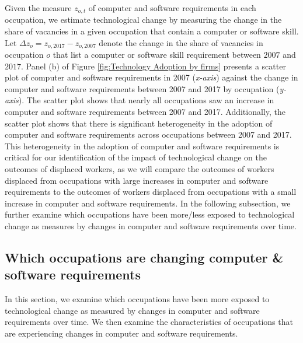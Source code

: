 \documentclass[12pt]{article}
\begin{document}
{Given the measure $z_{o,t}$ of computer and software requirements in each occupation, we estimate technological change by measuring the change in the share of vacancies in a given occupation that contain a computer or software skill. Let $\varDelta z_{o}=z_{o,2017}-z_{o,2007}$ denote the change in the share of vacancies in occupation $o$ that list a computer or software skill requirement between $2007$ and $2017$. Panel (b) of Figure \ref{fig:Technology Adoption by firms} presents a scatter plot of computer and software requirements in 2007 (\textit{x-axis}) against the change in computer and software requirements between 2007 and 2017 by occupation (\textit{y-axis}). The scatter plot shows that nearly all occupations saw an increase in computer and software requirements between 2007 and 2017. Additionally, the scatter plot shows that there is significant heterogeneity in the adoption of computer and software requirements across occupations between 2007 and 2017. This heterogeneity in the adoption of computer and software requirements is critical for our identification of the impact of technological change on the outcomes of displaced workers, as we will compare the outcomes of workers displaced from occupations with large increases in computer and software requirements to the outcomes of workers displaced from occupations with a small increase in computer and software requirements. In the following subsection, we further examine which occupations have been more/less exposed to technological change as measures by changes in computer and software requirements over time. 
	

\subsection{Which occupations are changing computer \& software requirements}

In this section, we examine which occupations have been more exposed to technological change as measured by changes in computer and software requirements over time. We then examine the characteristics of occupations that are experiencing changes in computer and software requirements. 

}
\end{document}
